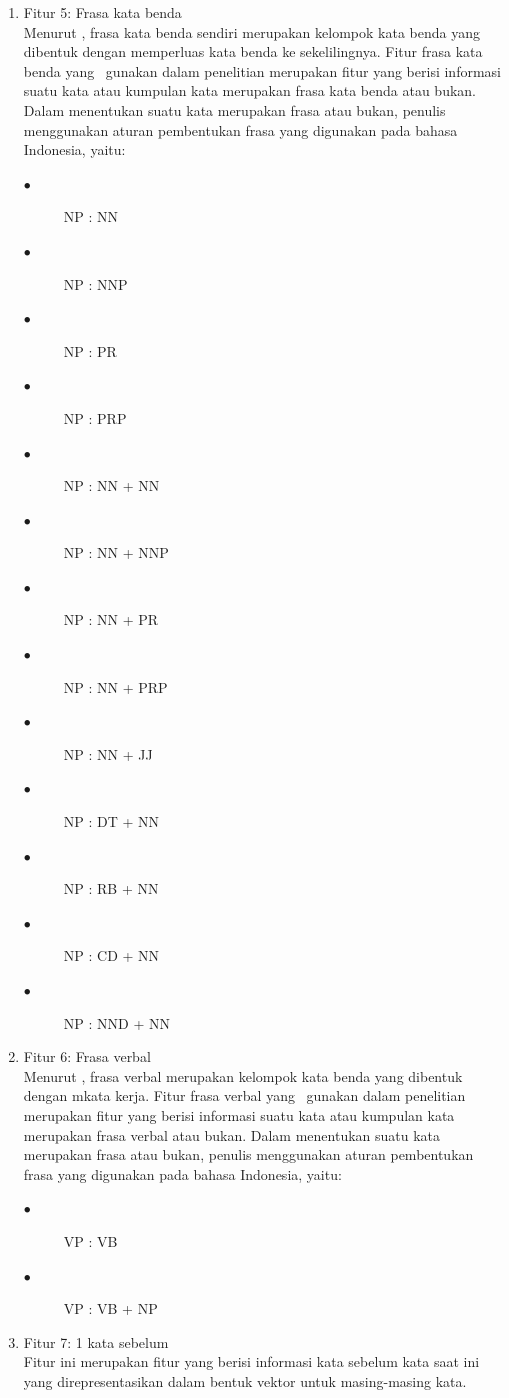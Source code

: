\begin{enumerate}
		\item Fitur 5: Frasa kata benda\\
		Menurut \cite{hs2005bahasa}, frasa kata benda sendiri merupakan kelompok kata benda yang dibentuk dengan memperluas kata benda ke sekelilingnya. Fitur frasa kata benda yang \saya~gunakan dalam penelitian merupakan fitur yang berisi informasi suatu kata atau kumpulan kata merupakan frasa kata benda atau bukan. Dalam menentukan suatu kata merupakan frasa atau bukan, penulis menggunakan aturan pembentukan frasa yang digunakan pada bahasa Indonesia, yaitu:
		\begin{description}
		 	\item[$\bullet$] NP : NN
		 	\item[$\bullet$] NP : NNP
		 	\item[$\bullet$] NP : PR
		 	\item[$\bullet$] NP : PRP
		 	\item[$\bullet$] NP : NN + NN
		 	\item[$\bullet$] NP : NN + NNP
		 	\item[$\bullet$] NP : NN + PR
		 	\item[$\bullet$] NP : NN + PRP
		 	\item[$\bullet$] NP : NN + JJ
		 	\item[$\bullet$] NP : DT + NN
		 	\item[$\bullet$] NP : RB + NN
		 	\item[$\bullet$] NP : CD + NN
		 	\item[$\bullet$] NP : NND + NN
		 \end{description}
	 
		 \item Fitur 6: Frasa verbal\\
		 Menurut \cite{hs2005bahasa}, frasa verbal merupakan kelompok kata benda yang dibentuk dengan mkata kerja. Fitur frasa verbal yang \saya~gunakan dalam penelitian merupakan fitur yang berisi informasi suatu kata atau kumpulan kata merupakan frasa verbal atau bukan. Dalam menentukan suatu kata merupakan frasa atau bukan, penulis menggunakan aturan pembentukan frasa yang digunakan pada bahasa Indonesia, yaitu:
		 \begin{description}
		 	\item[$\bullet$] VP : VB
		 	\item[$\bullet$] VP : VB + NP
		 \end{description}
	 
		 \item Fitur 7: 1 kata sebelum\\
		 Fitur ini merupakan fitur yang berisi informasi kata sebelum kata saat ini yang direpresentasikan dalam bentuk vektor untuk masing-masing kata.
		 

\end{enumerate}
